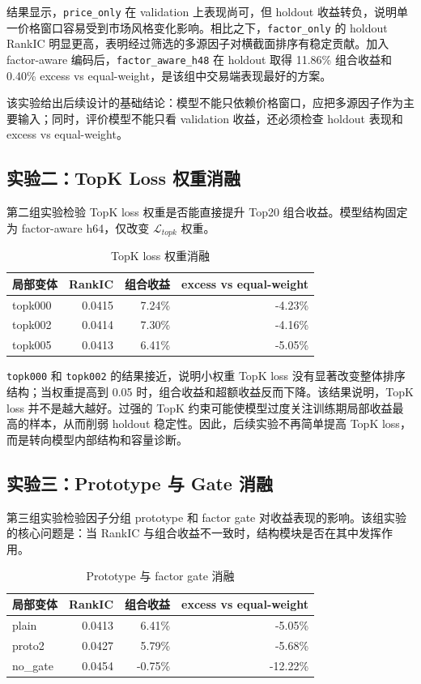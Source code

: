 \documentclass[UTF8,a4paper,12pt,fontset=none]{ctexart}
\begin{document}
结果显示，\texttt{price\_only} 在 validation 上表现尚可，但 holdout 收益转负，说明单一价格窗口容易受到市场风格变化影响。相比之下，\texttt{factor\_only} 的 holdout RankIC 明显更高，表明经过筛选的多源因子对横截面排序有稳定贡献。加入 factor-aware 编码后，\texttt{factor\_aware\_h48} 在 holdout 取得 11.86\% 组合收益和 0.40\% excess vs equal-weight，是该组中交易端表现最好的方案。

该实验给出后续设计的基础结论：模型不能只依赖价格窗口，应把多源因子作为主要输入；同时，评价模型不能只看 validation 收益，还必须检查 holdout 表现和 excess vs equal-weight。

\subsection{实验二：TopK Loss 权重消融}

第二组实验检验 TopK loss 权重是否能直接提升 Top20 组合收益。模型结构固定为 factor-aware h64，仅改变 $\mathcal{L}_{topk}$ 权重。

\begin{table}[H]
  \centering
  \caption{TopK loss 权重消融}
  \label{tab:topk_ablation}
  \begin{tabular}{lrrr}
    \toprule
    局部变体 & RankIC & 组合收益 & excess vs equal-weight \\
    \midrule
    topk000 & 0.0415 & 7.24\% & -4.23\% \\
    topk002 & 0.0414 & 7.30\% & -4.16\% \\
    topk005 & 0.0413 & 6.41\% & -5.05\% \\
    \bottomrule
  \end{tabular}
\end{table}

\texttt{topk000} 和 \texttt{topk002} 的结果接近，说明小权重 TopK loss 没有显著改变整体排序结构；当权重提高到 0.05 时，组合收益和超额收益反而下降。该结果说明，TopK loss 并不是越大越好。过强的 TopK 约束可能使模型过度关注训练期局部收益最高的样本，从而削弱 holdout 稳定性。因此，后续实验不再简单提高 TopK loss，而是转向模型内部结构和容量诊断。

\subsection{实验三：Prototype 与 Gate 消融}

第三组实验检验因子分组 prototype 和 factor gate 对收益表现的影响。该组实验的核心问题是：当 RankIC 与组合收益不一致时，结构模块是否在其中发挥作用。

\begin{table}[H]
  \centering
  \caption{Prototype 与 factor gate 消融}
  \label{tab:prototype_gate_ablation}
  \begin{tabular}{lrrr}
    \toprule
    局部变体 & RankIC & 组合收益 & excess vs equal-weight \\
    \midrule
    plain & 0.0413 & 6.41\% & -5.05\% \\
    proto2 & 0.0427 & 5.79\% & -5.68\% \\
    no\_gate & 0.0454 & -0.75\% & -12.22\% \\
    \bottomrule
  \end{tabular}
\end{table}
\end{document}
